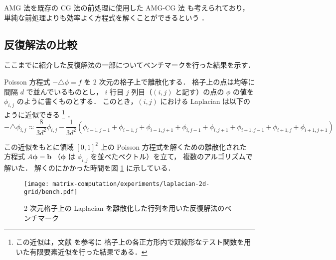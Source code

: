 AMG 法を既存の CG 法の前処理に使用した AMG-CG 法
も考えられており，
単純な前処理よりも効率よく方程式を解くことができるという
\cite{Wolters2002}．

\clearpage

\subsection{反復解法の比較}

ここまでに紹介した反復解法の一部についてベンチマークを行った結果を示す．

Poisson 方程式 $-\triangle\phi = f$ を 2 次元の格子上で離散化する．
格子上の点は均等に間隔 $d$ で並んでいるものとし，
$i$ 行目 $j$ 列目（$(i, j)$ と記す）の点の $\phi$ の値を $\phi_{i,j}$ のように書くものとする．
このとき，$(i, j)$ における Laplacian は以下のように近似できる
\footnote{この近似は，文献 \cite{Knabner2003} を参考に%
    格子上の各正方形内で双線形なテスト関数を用いた有限要素近似を行った結果である．}
．
\begin{equation}
    -\triangle \phi_{i,j} \approx
    \frac{8}{3d^2} \phi_{i,j} - \frac{1}{3d^2} \left(
    \phi_{i-1,j-1} + \phi_{i-1,j} + \phi_{i-1,j+1}
    + \phi_{i,j-1} + \phi_{i,j+1}
    + \phi_{i+1,j-1} + \phi_{i+1,j} + \phi_{i+1,j+1}
    \right)
\end{equation}

この近似をもとに領域 $[0, 1]^2$ 上の Poisson 方程式を解くための離散化された
方程式 $A \bm{\phi} = \bm{b}$ （$\bm{\phi}$ は $\phi_{i,j}$ を並べたベクトル）を立て，
複数のアルゴリズムで解いた．
解くのにかかった時間を図 \ref{fig:matrix-computation_bench-laplacian-2d-grid} に示している．


\begin{figure}[tp]
    \centering
    \texttt{[image: matrix-computation/experiments/laplacian-2d-grid/bench.pdf]}
    \caption{2 次元格子上の Laplacian を離散化した行列を用いた反復解法のベンチマーク}
    \label{fig:matrix-computation_bench-laplacian-2d-grid}
\end{figure}
